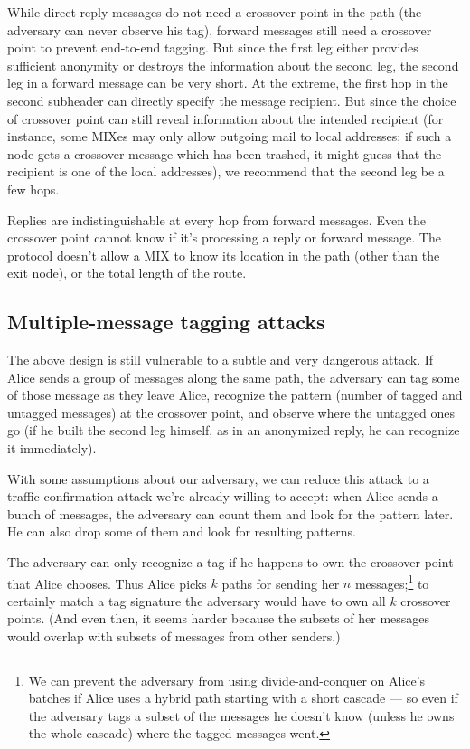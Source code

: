 \documentclass{llncs}
\begin{document}
While direct reply messages do not need a crossover point in the path
(the adversary can never observe his tag), forward messages still need a
crossover point to prevent end-to-end tagging. But since the first leg
either provides sufficient anonymity or destroys the information about
the second leg, the second leg in a forward message can be very short.
At the extreme, the first hop in the second subheader can directly
specify the message recipient. But since the choice of crossover point
can still reveal information about the intended recipient (for instance,
some MIXes may only allow outgoing mail to local addresses; if such a
node gets a crossover message which has been trashed, it might guess
that the recipient is one of the local addresses), we recommend that
the second leg be a few hops.

Replies are indistinguishable at every hop from forward messages. Even the
crossover point cannot know if it's processing a reply or forward message.
The protocol doesn't allow a MIX to know its location in the path (other
than the exit node), or the total length of the route.

\subsection{Multiple-message tagging attacks}

The above design is still vulnerable to a subtle and very dangerous
attack. If Alice sends a group of messages along the same path, the
adversary can tag some of those message as they leave Alice, recognize
the pattern (number of tagged and untagged messages) at the crossover
point, and observe where the untagged ones go (if he built the second
leg himself, as in an anonymized reply, he can recognize it immediately).

With some assumptions about our adversary, we can reduce
this attack to a traffic confirmation attack we're already willing to
accept: when Alice sends a bunch of messages, the adversary can count
them and look for the pattern later. He can also drop some of them and
look for resulting patterns.

The adversary can only recognize a tag if he happens to own the crossover
point that Alice chooses.
Thus Alice picks $k$ paths for sending her $n$
messages;\footnote{
  We can prevent the adversary from using divide-and-conquer on Alice's
  batches if Alice uses a hybrid path starting with a short cascade ---
  so even if the adversary tags a subset of the messages he doesn't know
  (unless he owns the whole cascade) where the tagged messages went.
}
to certainly match a tag signature the adversary would have to own all $k$
crossover points. (And even then, it seems harder because the subsets of
her messages would overlap with subsets of messages from other senders.)
\end{document}
